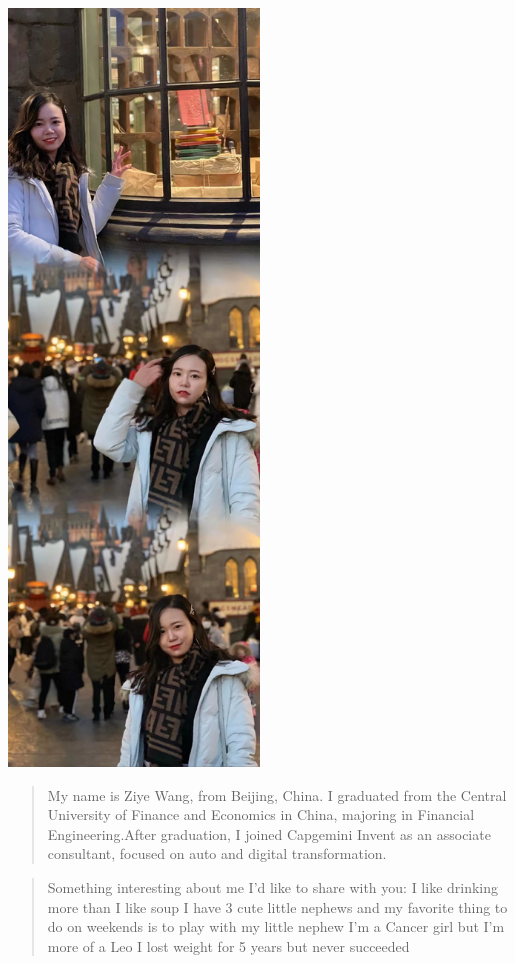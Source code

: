 \documentclass[
]{book}
\begin{document}
\includegraphics[width=0.5\textwidth,height=\textheight]{Photo3.jpg}

\begin{quote}
My name is Ziye Wang, from Beijing, China. I graduated from the Central University of Finance and Economics in China, majoring in Financial Engineering.After graduation, I joined Capgemini Invent as an associate consultant, focused on auto and digital transformation.
\end{quote}

\begin{quote}
Something interesting about me I'd like to share with you:
I like drinking more than I like soup
I have 3 cute little nephews and my favorite thing to do on weekends is to play with my little nephew
I'm a Cancer girl but I'm more of a Leo
I lost weight for 5 years but never succeeded
\end{quote}
\end{document}
